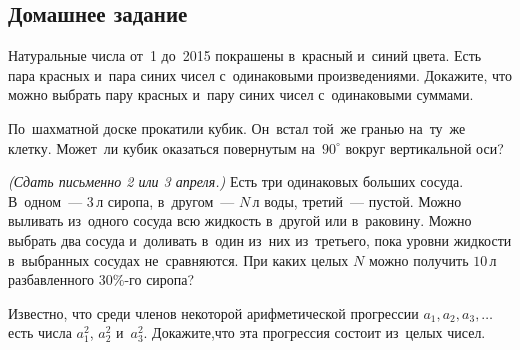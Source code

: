 

\subsection*{Домашнее задание}



\begin{problems}

\item
Натуральные числа от~1 до~2015 покрашены в~красный и~синий цвета.
Есть пара красных и~пара синих чисел с~одинаковыми произведениями.
Докажите, что можно выбрать пару красных и~пару синих чисел с~одинаковыми
суммами.

\item
По~шахматной доске прокатили кубик.
Он~встал той~же гранью на~ту~же клетку.
Может~ли кубик оказаться повернутым на~$90^\circ$ вокруг вертикальной оси?


\item
\emph{(Сдать письменно 2 или 3 апреля.)}
Есть три одинаковых больших сосуда.
В~одном~— $3 \, \text{л}$ сиропа, в~другом~— $N \, \text{л}$ воды,
третий~— пустой.
Можно выливать из~одного сосуда всю жидкость в~другой или в~раковину.
Можно выбрать два сосуда и~доливать в~один из~них из~третьего, пока уровни
жидкости в~выбранных сосудах не~сравняются.
При каких целых $N$ можно получить $10 \, \text{л}$ разбавленного $30\%$-го
сиропа?

\item
Известно, что среди членов некоторой арифметической прогрессии
$a_1, a_2, a_3, \ldots$ есть числа $a_1^2$, $a_2^2$ и~$a_3^2$.
Докажите,что эта прогрессия состоит из~целых чисел.

\end{problems}

